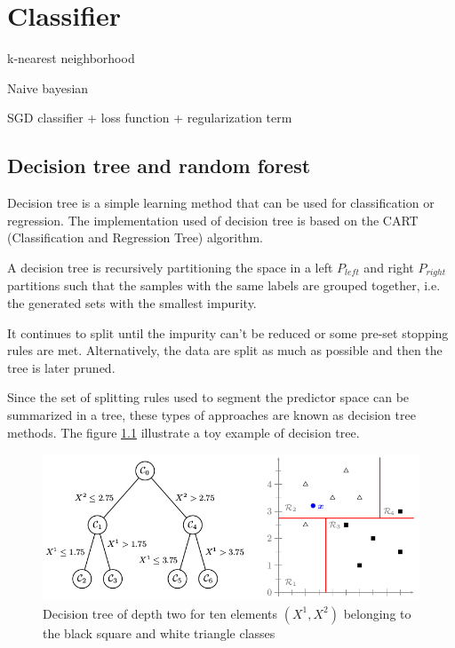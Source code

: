 \chapter{Classifier}  \label{sec:classifier}

k-nearest neighborhood

Naive bayesian

SGD classifier + loss function + regularization term%

\section{Decision tree and random forest}

Decision tree is a simple learning method that can be used for classification or regression. The implementation used of decision tree is based on the CART (Classification and Regression Tree) algorithm.

A decision tree is recursively partitioning the space in a left $P_{left}$ and right $P_{right}$ partitions such that the samples with the same labels are grouped together, i.e. the generated sets with the smallest impurity.

It continues to split until the impurity can't be reduced or some pre-set stopping rules are met. Alternatively, the data are split as much as possible and then the tree is later pruned.

Since the set of splitting rules used to segment the predictor space can be summarized in a tree, these types of approaches are known as decision tree methods. The figure  \ref{fig:decision_tree_simple_example} illustrate a toy example of decision tree.

\begin{figure}[h]
    \includegraphics[scale=0.5]{img/decision_tree_simple_example}
    \caption[Decision tree of for ten elements belonging to two classes]{Decision tree of depth two for ten elements $(X^1, X^2)$ belonging to the black square and white triangle classes}
    \label{fig:decision_tree_simple_example}
\end{figure}

